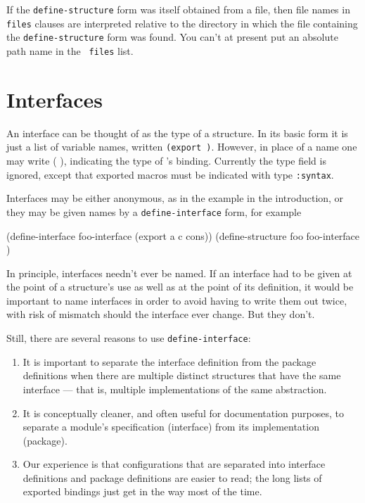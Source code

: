 If the {\tt define-structure} form was itself obtained from a file,
then file names in {\tt files} clauses are interpreted relative to the
directory in which the file containing the {\tt define-structure} form
was found.  You can't at present put an absolute path name in the {\tt
files} list.


\section{Interfaces}

An interface can be thought of as the type of a structure.  In its
basic form it is just a list of variable names, written {\tt(export
 \etc)}.  However, in place of
a name one may write {\code ( )}, indicating the type
of 's binding.  Currently the type field is ignored, except
that exported macros must be indicated with type {\tt :syntax}.

Interfaces may be either anonymous, as in the example in the
introduction, or they may be given names by a {\tt define-interface}
form, for example
\begin{example}
(define-interface foo-interface (export a c cons))
(define-structure foo foo-interface \etc)
\end{example}
In principle, interfaces needn't ever be named.  If an interface
had to be given at the point of a structure's use as well as at the
point of its definition, it would be important to name interfaces in
order to avoid having to write them out twice, with risk of mismatch
should the interface ever change.  But they don't.

Still, there are several reasons to use {\tt define-interface}:
\begin{enumerate}
\item It is important to separate the interface definition from the
package definitions when there are multiple distinct structures that
have the same interface --- that is, multiple implementations of the
same abstraction.

\item It is conceptually cleaner, and often useful for documentation
purposes, to separate a module's specification (interface) from its
implementation (package).

\item Our experience is that configurations that are separated into
interface definitions and package definitions are easier to read; the
long lists of exported bindings just get in the way most of the time.
\end{enumerate}

